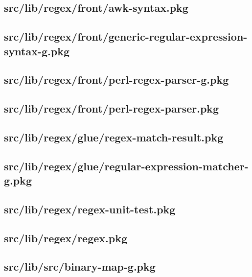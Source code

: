 \subsection{src/lib/regex/front/awk-syntax.pkg}


\subsection{src/lib/regex/front/generic-regular-expression-syntax-g.pkg}


\subsection{src/lib/regex/front/perl-regex-parser-g.pkg}


\subsection{src/lib/regex/front/perl-regex-parser.pkg}


\subsection{src/lib/regex/glue/regex-match-result.pkg}


\subsection{src/lib/regex/glue/regular-expression-matcher-g.pkg}


\subsection{src/lib/regex/regex-unit-test.pkg}


\subsection{src/lib/regex/regex.pkg}


\subsection{src/lib/src/binary-map-g.pkg}


